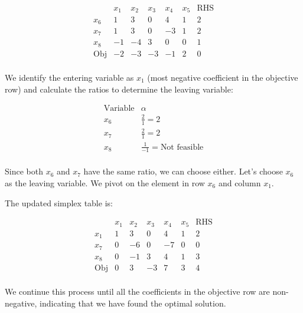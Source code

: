 \[ 
\begin{array}{c|cccccc|c}
 & x_1 & x_2 & x_3 & x_4 & x_5 & \text{RHS} \\
\hline
x_6 & 1 & 3 & 0 & 4 & 1 & 2 \\
x_7 & 1 & 3 & 0 & -3 & 1 & 2 \\
x_8 & -1 & -4 & 3 & 0 & 0 & 1 \\
\hline
\text{Obj} & -2 & -3 & -3 & -1 & 2 & 0 \\
\end{array}
\]

We identify the entering variable as $x_1$ (most negative coefficient in the objective row) and calculate the ratios to determine the leaving variable:

\[
\begin{array}{c|c}
\text{Variable} & \alpha \\
\hline
x_6 & \frac{2}{1} = 2 \\
x_7 & \frac{2}{1} = 2 \\
x_8 & \frac{1}{-1} = \text{Not feasible} \\
\end{array}
\]

Since both $x_6$ and $x_7$ have the same ratio, we can choose either. Let's choose $x_6$ as the leaving variable. We pivot on the element in row $x_6$ and column $x_1$.

The updated simplex table is:

\[ 
\begin{array}{c|cccccc|c}
 & x_1 & x_2 & x_3 & x_4 & x_5 & \text{RHS} \\
\hline
x_1 & 1 & 3 & 0 & 4 & 1 & 2 \\
x_7 & 0 & -6 & 0 & -7 & 0 & 0 \\
x_8 & 0 & -1 & 3 & 4 & 1 & 3 \\
\hline
\text{Obj} & 0 & 3 & -3 & 7 & 3 & 4 \\
\end{array}
\]

We continue this process until all the coefficients in the objective row are non-negative, indicating that we have found the optimal solution.